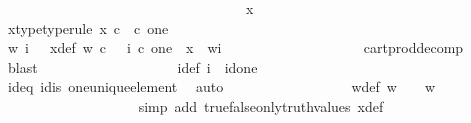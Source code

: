 \begin{isabellebody}
\ \ \ \ \ \ \ \ \ \ \ \ \ \ \isamarkupfalse%
\ {\isacharminus}{\kern0pt}\ \isanewline
\ \ \ \ \ \ \ \ \ \ \ \ \ \ \ \ \isamarkupfalse%
\ x\isanewline
\ \ \ \ \ \ \ \ \ \ \ \ \ \ \ \ \isamarkupfalse%
\ x{\isacharunderscore}{\kern0pt}type{\isacharbrackleft}{\kern0pt}type{\isacharunderscore}{\kern0pt}rule{\isacharbrackright}{\kern0pt}{\isacharcolon}{\kern0pt}\ {\isachardoublequoteopen}x\ {\isasymin}\isactrlsub c\ {\isasymOmega}\ {\isasymtimes}\isactrlsub c\ one{\isachardoublequoteclose}\isanewline
\ \ \ \ \ \ \ \ \ \ \ \ \ \ \ \ \isamarkupfalse%
\ \isamarkupfalse%
\ w\ i\ \ \ x{\isacharunderscore}{\kern0pt}def{\isacharcolon}{\kern0pt}\ {\isachardoublequoteopen}{\isacharparenleft}{\kern0pt}w\ {\isasymin}\isactrlsub c\ {\isasymOmega}{\isacharparenright}{\kern0pt}\ {\isasymand}\ {\isacharparenleft}{\kern0pt}i\ {\isasymin}\isactrlsub c\ one{\isacharparenright}{\kern0pt}\ {\isasymand}\ {\isacharparenleft}{\kern0pt}x\ {\isacharequal}{\kern0pt}\ {\isasymlangle}w{\isacharcomma}{\kern0pt}i{\isasymrangle}{\isacharparenright}{\kern0pt}{\isachardoublequoteclose}\isanewline
\ \ \ \ \ \ \ \ \ \ \ \ \ \ \ \ \ \ \isamarkupfalse%
\ cart{\isacharunderscore}{\kern0pt}prod{\isacharunderscore}{\kern0pt}decomp\ \isamarkupfalse%
\ blast\isanewline
\ \ \ \ \ \ \ \ \ \ \ \ \ \ \ \ \isamarkupfalse%
\ \isamarkupfalse%
\ i{\isacharunderscore}{\kern0pt}def{\isacharcolon}{\kern0pt}\ {\isachardoublequoteopen}i\ {\isacharequal}{\kern0pt}\ id{\isacharparenleft}{\kern0pt}one{\isacharparenright}{\kern0pt}{\isachardoublequoteclose}\isanewline
\ \ \ \ \ \ \ \ \ \ \ \ \ \ \ \ \ \ \isamarkupfalse%
\ id{}{\isacharunderscore}{\kern0pt}eq\ id{}{\isacharunderscore}{\kern0pt}is\ one{\isacharunderscore}{\kern0pt}unique{\isacharunderscore}{\kern0pt}element\ \isamarkupfalse%
\ auto\isanewline
\ \ \ \ \ \ \ \ \ \ \ \ \ \ \ \ \isamarkupfalse%
\ w{\isacharunderscore}{\kern0pt}def{\isacharcolon}{\kern0pt}\ {\isachardoublequoteopen}{\isacharparenleft}{\kern0pt}w\ {\isacharequal}{\kern0pt}\ {\isasymf}{\isacharparenright}{\kern0pt}\ {\isasymor}\ {\isacharparenleft}{\kern0pt}w\ {\isacharequal}{\kern0pt}\ {\isasymt}{\isacharparenright}{\kern0pt}{\isachardoublequoteclose}\isanewline
\ \ \ \ \ \ \ \ \ \ \ \ \ \ \ \ \ \ \isamarkupfalse%
\ {\isacharparenleft}{\kern0pt}simp\ add{\isacharcolon}{\kern0pt}\ true{\isacharunderscore}{\kern0pt}false{\isacharunderscore}{\kern0pt}only{\isacharunderscore}{\kern0pt}truth{\isacharunderscore}{\kern0pt}values\ x{\isacharunderscore}{\kern0pt}def{\isacharparenright}{\kern0pt}\isanewline

\end{isabellebody}
